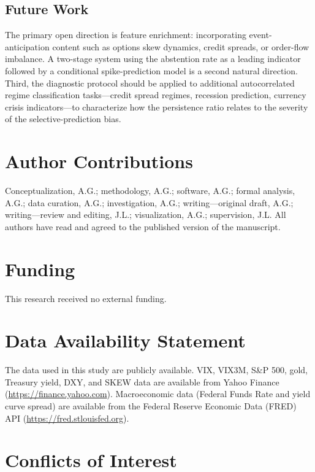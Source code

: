 \documentclass[12pt]{article}
\begin{document}
\subsection*{Future Work}

The primary open direction is feature enrichment: incorporating event-anticipation content such
as options skew dynamics, credit spreads, or order-flow imbalance. A two-stage system using the
abstention rate as a leading indicator followed by a conditional spike-prediction model is a
second natural direction. Third, the diagnostic protocol should be applied to additional
autocorrelated regime classification tasks---credit spread regimes, recession prediction,
currency crisis indicators---to characterize how the persistence ratio relates to the severity
of the selective-prediction bias.


\section*{Author Contributions}

Conceptualization, A.G.; methodology, A.G.; software, A.G.; formal analysis, A.G.; data
curation, A.G.; investigation, A.G.; writing---original draft, A.G.; writing---review and
editing, J.L.; visualization, A.G.; supervision, J.L. All authors have read and agreed to the
published version of the manuscript.

\section*{Funding}

This research received no external funding.

\section*{Data Availability Statement}

The data used in this study are publicly available. VIX, VIX3M, S\&P 500, gold, Treasury yield,
DXY, and SKEW data are available from Yahoo Finance (\url{https://finance.yahoo.com}).
Macroeconomic data (Federal Funds Rate and yield curve spread) are available from the Federal
Reserve Economic Data (FRED) API (\url{https://fred.stlouisfed.org}).

\section*{Conflicts of Interest}
\end{document}
